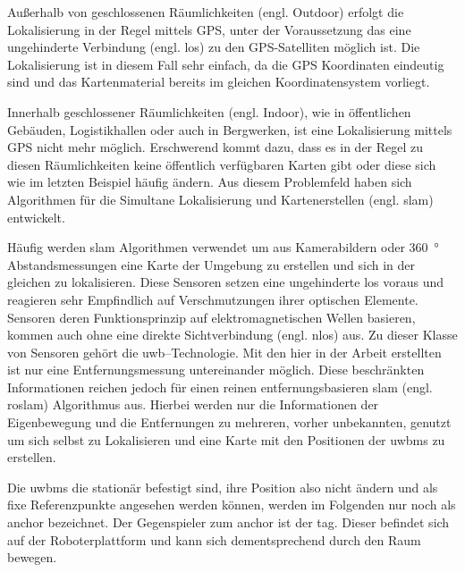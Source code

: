 Außerhalb von geschlossenen Räumlichkeiten (engl. Outdoor) erfolgt die Lokalisierung in der Regel mittels GPS, unter der Voraussetzung das eine ungehinderte Verbindung (engl. \acrfull{los}) zu den GPS-Satelliten möglich ist. Die Lokalisierung ist in diesem Fall sehr einfach, da die GPS Koordinaten eindeutig sind und das Kartenmaterial bereits im gleichen Koordinatensystem vorliegt.

Innerhalb geschlossener Räumlichkeiten (engl. Indoor), wie in öffentlichen Gebäuden, Logistikhallen oder auch in Bergwerken, ist eine Lokalisierung mittels GPS nicht mehr möglich. Erschwerend kommt dazu, dass es in der Regel zu diesen Räumlichkeiten keine öffentlich verfügbaren Karten gibt oder diese sich wie im letzten Beispiel häufig ändern. Aus diesem Problemfeld haben sich Algorithmen für die Simultane Lokalisierung und Kartenerstellen (engl. \Gls{slam}) entwickelt.

Häufig werden \Gls{slam} Algorithmen verwendet um aus Kamerabildern oder \SI{360}{\degree} Abstandsmessungen eine Karte der Umgebung zu erstellen und sich in der gleichen zu lokalisieren. Diese Sensoren setzen eine ungehinderte \Gls{los} voraus und reagieren sehr Empfindlich auf Verschmutzungen ihrer optischen Elemente. Sensoren deren Funktionsprinzip auf elektromagnetischen Wellen basieren, kommen auch ohne eine direkte Sichtverbindung (engl. \Gls{nlos}) aus. Zu dieser Klasse von Sensoren gehört die \Gls{uwb}--Technologie. Mit den hier in der Arbeit erstellten  ist nur eine Entfernungsmessung untereinander möglich. Diese beschränkten Informationen reichen jedoch für einen reinen entfernungsbasieren \Gls{slam} (engl. \gls{roslam}) Algorithmus aus. Hierbei werden nur die Informationen der Eigenbewegung und die Entfernungen zu mehreren, vorher unbekannten,  genutzt um sich selbst zu Lokalisieren und eine Karte mit den Positionen der \Glspl{uwbm} zu erstellen.

Die \Glspl{uwbm} die stationär befestigt sind, ihre Position also nicht ändern und als fixe Referenzpunkte angesehen werden können, werden im Folgenden nur noch als \Gls{anchor} bezeichnet. Der Gegenspieler zum \Gls{anchor} ist der \Gls{tag}. Dieser befindet sich auf der Roboterplattform und kann sich dementsprechend durch den Raum bewegen.




\begin{comment}
------------------------------------------------------------------------------------------
\end{comment}


